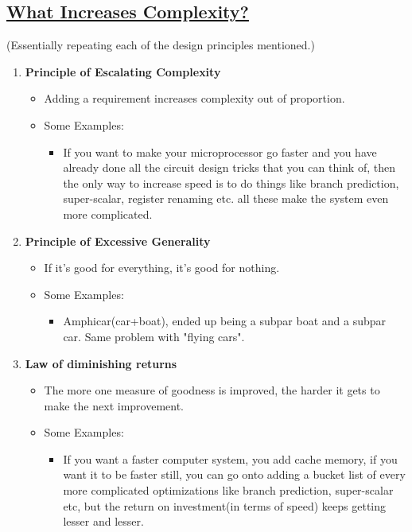 \documentclass{article}
\begin{document}
\subsection*{\underline{What Increases Complexity?}}
(Essentially repeating each of the design principles mentioned.)
\begin{enumerate}
    \item \textbf{Principle of Escalating Complexity}
    \begin{itemize}
        \item Adding a requirement increases complexity out of proportion.
        \item[] Some Examples:
        \begin{itemize}
            \item If you want to make your microprocessor go faster and you have already done all the circuit design tricks that you can think of, then the only way to increase speed is to do things like branch prediction, super-scalar, register renaming etc. all these make the system even more complicated.
        \end{itemize}
    \end{itemize}
    \item \textbf{Principle of Excessive Generality}
    \begin{itemize}
        \item If it's good for everything, it's good for nothing.
        \item[] Some Examples:
        \begin{itemize}
            \item Amphicar(car+boat), ended up being a subpar boat and a subpar car. Same problem with "flying cars".
        \end{itemize}
    \end{itemize}
    \item \textbf{Law of diminishing returns}
    \begin{itemize}
        \item The more one measure of goodness is improved, the harder it gets to make the next improvement.
        \item[] Some Examples:
        \begin{itemize}
            \item If you want a faster computer system, you add cache memory, if you want it to be faster still, you can go onto adding a bucket list of every more complicated optimizations like branch prediction, super-scalar etc, but the return on investment(in terms of speed) keeps getting lesser and lesser.
        \end{itemize}
    \end{itemize}
\end{enumerate}
\end{document}
